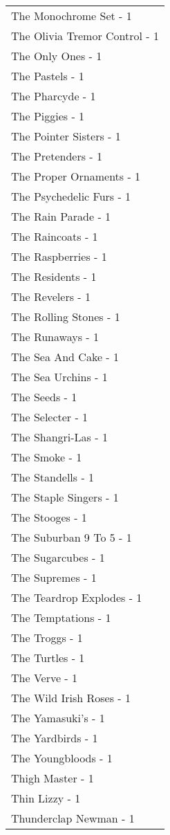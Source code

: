 \documentclass[
]{article}
\begin{document}
\begin{longtable}{l}
The Monochrome Set - 1 \\ 
The Olivia Tremor Control - 1 \\ 
The Only Ones - 1 \\ 
The Pastels - 1 \\ 
The Pharcyde - 1 \\ 
The Piggies - 1 \\ 
The Pointer Sisters - 1 \\ 
The Pretenders - 1 \\ 
The Proper Ornaments - 1 \\ 
The Psychedelic Furs - 1 \\ 
The Rain Parade - 1 \\ 
The Raincoats - 1 \\ 
The Raspberries - 1 \\ 
The Residents - 1 \\ 
The Revelers - 1 \\ 
The Rolling Stones - 1 \\ 
The Runaways - 1 \\ 
The Sea And Cake - 1 \\ 
The Sea Urchins - 1 \\ 
The Seeds - 1 \\ 
The Selecter - 1 \\ 
The Shangri-Las - 1 \\ 
The Smoke - 1 \\ 
The Standells - 1 \\ 
The Staple Singers - 1 \\ 
The Stooges - 1 \\ 
The Suburban 9 To 5 - 1 \\ 
The Sugarcubes - 1 \\ 
The Supremes - 1 \\ 
The Teardrop Explodes - 1 \\ 
The Temptations - 1 \\ 
The Troggs - 1 \\ 
The Turtles - 1 \\ 
The Verve - 1 \\ 
The Wild Irish Roses - 1 \\ 
The Yamasuki's - 1 \\ 
The Yardbirds - 1 \\ 
The Youngbloods - 1 \\ 
Thigh Master - 1 \\ 
Thin Lizzy - 1 \\ 
Thunderclap Newman - 1 \\ 

\end{longtable}
\end{document}
